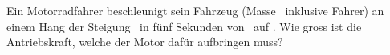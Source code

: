 Ein Motorradfahrer beschleunigt sein Fahrzeug (Masse \mMoO\ inklusive Fahrer) an einem Hang der Steigung \stgO\ in fünf Sekunden von \vAnO\ auf \vEnO. Wie gross ist die Antriebskraft, welche der Motor dafür aufbringen muss?
